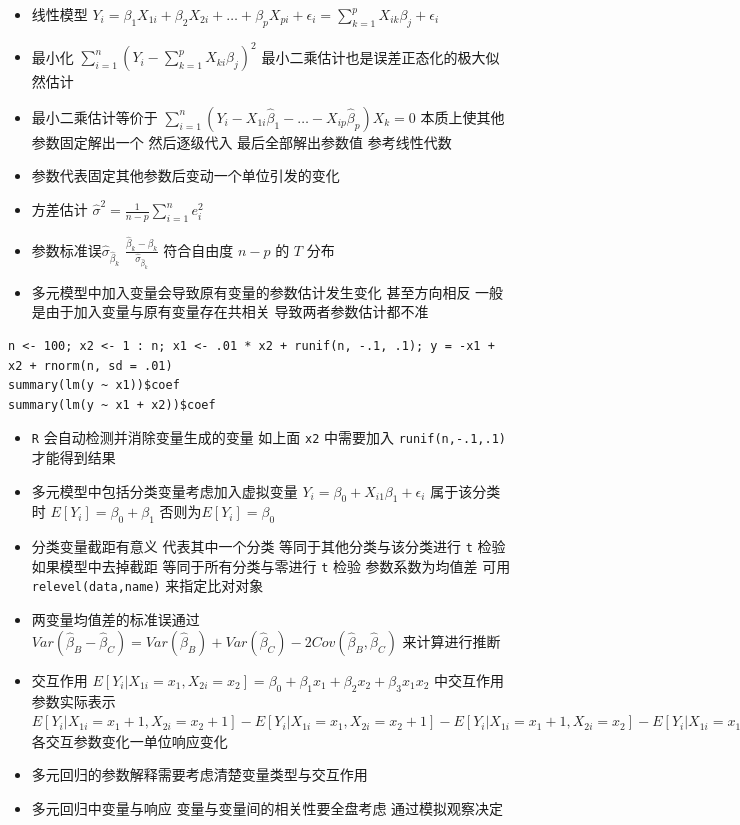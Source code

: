 \documentclass[]{book}
\providecommand{\tightlist}{%
  \setlength{\itemsep}{0pt}\setlength{\parskip}{0pt}}
\begin{document}
\begin{itemize}
\tightlist
\item
  线性模型 \(Y_i = \beta_1 X_{1i} + \beta_2 X_{2i} + \ldots + \beta_{p} X_{pi} + \epsilon_{i} = \sum_{k=1}^p X_{ik} \beta_j + \epsilon_{i}\)
\item
  最小化 \(\sum_{i=1}^n \left(Y_i - \sum_{k=1}^p X_{ki} \beta_j\right)^2\) 最小二乘估计也是误差正态化的极大似然估计
\item
  最小二乘估计等价于 \(\sum_{i=1}^n (Y_i - X_{1i}\hat \beta_1 - \ldots - X_{ip}\hat \beta_p) X_k = 0\) 本质上使其他参数固定解出一个 然后逐级代入 最后全部解出参数值 参考线性代数
\item
  参数代表固定其他参数后变动一个单位引发的变化
\item
  方差估计 \(\hat \sigma^2 = \frac{1}{n-p} \sum_{i=1}^n e_i ^2\)
\item
  参数标准误\(\hat \sigma_{\hat \beta_k}\) \(\frac{\hat \beta_k - \beta_k}{\hat \sigma_{\hat \beta_k}}\) 符合自由度 \(n-p\) 的 \(T\) 分布
\item
  多元模型中加入变量会导致原有变量的参数估计发生变化 甚至方向相反 一般是由于加入变量与原有变量存在共相关 导致两者参数估计都不准
\end{itemize}

\begin{verbatim}
n <- 100; x2 <- 1 : n; x1 <- .01 * x2 + runif(n, -.1, .1); y = -x1 + x2 + rnorm(n, sd = .01)
summary(lm(y ~ x1))$coef
summary(lm(y ~ x1 + x2))$coef
\end{verbatim}

\begin{itemize}
\tightlist
\item
  \texttt{R} 会自动检测并消除变量生成的变量 如上面 \texttt{x2} 中需要加入 \texttt{runif(n,-.1,.1)} 才能得到结果
\item
  多元模型中包括分类变量考虑加入虚拟变量 \(Y_i = \beta_0 + X_{i1} \beta_1 + \epsilon_{i}\) 属于该分类时 \(E[Y_i] = \beta_0 + \beta_1\) 否则为\(E[Y_i] = \beta_0\)
\item
  分类变量截距有意义 代表其中一个分类 等同于其他分类与该分类进行 \texttt{t} 检验 如果模型中去掉截距 等同于所有分类与零进行 \texttt{t} 检验 参数系数为均值差 可用 \texttt{relevel(data,\textquotesingle{}name\textquotesingle{})} 来指定比对对象
\item
  两变量均值差的标准误通过 \(Var(\hat \beta_B - \hat \beta_C) = Var(\hat \beta_B) + Var(\hat \beta_C) - 2 Cov(\hat \beta_B, \hat \beta_C)\) 来计算进行推断
\item
  交互作用 \(E[Y_i | X_{1i}=x_1, X_{2i}=x_2] = \beta_0 + \beta_1 x_{1} + \beta_2 x_{2} + \beta_3 x_{1}x_{2}\) 中交互作用参数实际表示 \(E[Y_i | X_{1i}=x_1+1, X_{2i}=x_2+1]-E[Y_i | X_{1i}=x_1, X_{2i}=x_2+1]-E[Y_i | X_{1i}=x_1+1, X_{2i}=x_2]-E[Y_i | X_{1i}=x_1, X_{2i}=x_2] =\beta_3\) 各交互参数变化一单位响应变化
\item
  多元回归的参数解释需要考虑清楚变量类型与交互作用
\item
  多元回归中变量与响应 变量与变量间的相关性要全盘考虑 通过模拟观察决定
\end{itemize}
\end{document}
